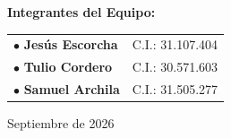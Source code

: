 \documentclass[11pt,letterpaper]{article}
\newcommand{\Fecha}{Septiembre de 2026}
\begin{document}
\begin{titlepage}
    \vfill

    \begin{minipage}[t]{0.85\textwidth}
        \begin{flushleft}
            \textbf{\color{UCBlue}Integrantes del Equipo:}\par\vspace{0.25cm}
            \begin{tabular}{ll}
                $\bullet$ \textbf{Jesús Escorcha} & C.I.: 31.107.404 \\
                $\bullet$ \textbf{Tulio Cordero}  & C.I.: 30.571.603 \\
                $\bullet$ \textbf{Samuel Archila} & C.I.: 31.505.277 \\
            \end{tabular}
        \end{flushleft}
    \end{minipage}

    \vspace{0.8cm}
    {\normalsize\color{DarkText} \Fecha}
    \vspace*{0.2cm}
\end{titlepage}

\newpage
\thispagestyle{plain}
\end{document}
